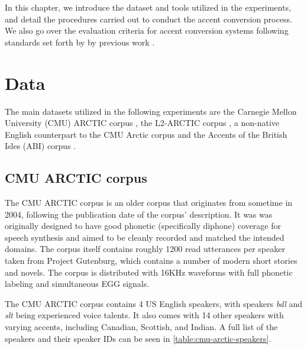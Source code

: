 \documentclass
[
    a4paper,
    twoside,
    12pt,
]
{report}
\begin{document}
In this chapter, we introduce the dataset and tools utilized in the
experiments, and detail the procedures carried out to conduct the accent
conversion process. We also go over the evaluation criteria for accent
conversion systems following standards set forth by by previous work
\textcite{aryal2014, mohammadi2017, zhao2018a}.

\hypertarget{data}{%
\section{Data}\label{data}}

The main datasets utilized in the following experiments are the Carnegie
Mellon University (CMU) ARCTIC corpus \parencite{kominek2004}, the
L2-ARCTIC corpus \parencite{zhao2018}, a non-native English counterpart
to the CMU Arctic corpus and the Accents of the British Isles (ABI)
corpus \parencite{darcy2004}.

\hypertarget{cmu-arctic-corpus}{%
\subsection{CMU ARCTIC corpus}\label{cmu-arctic-corpus}}

The CMU ARCTIC corpus is an older corpus that originates from sometime
in 2004, following the publication date of the corpus' description. It
was was originally designed to have good phonetic (specifically diphone)
coverage for speech synthesis and aimed to be cleanly recorded and
matched the intended domains. The corpus itself contains roughly 1200
read utterances per speaker taken from Project Gutenburg, which contains
a number of modern short stories and novels. The corpus is distributed
with 16KHz waveforms with full phonetic labeling and simultaneous EGG
signals.

The CMU ARCTIC corpus contains 4 US English speakers, with speakers
\emph{bdl} and \emph{slt} being experienced voice talents. It also comes
with 14 other speakers with varying accents, including Canadian,
Scottish, and Indian. A full list of the speakers and their speaker IDs
can be seen in \autoref{table:cmu-arctic-speakers}.
\end{document}
